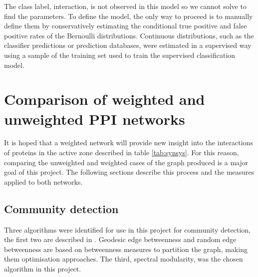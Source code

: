 
The class label, interaction, is not observed in this model so we cannot solve to find the parameters.
To define the model, the only way to proceed is to manually define them by conservatively estimating the conditional true positive and false positive rates of the Bernoulli distributions.
Continuous distributions, such as the classifier predictions or prediction databases, were estimated in a supervised way using a sample of the training set used to train the supervised classification model.


\section{Comparison of weighted and unweighted \ac{PPI} networks}

It is hoped that a weighted network will provide new insight into the interactions of proteins in the active zone described in table \ref{tab:synsys}.
For this reason, comparing the unweighted and weighted cases of the graph produced is a major goal of this project.
The following sections describe this process and the measures applied to both networks.

\subsection{Community detection}
\label{communitydetection}
Three algorithms were identified for use in this project for community detection, the first two are described in \textcite{newman_finding_2004}.
Geodesic edge betweenness and random edge betweenness are based on betweenness measures to partition the graph, making them optimisation approaches.
The third, spectral modularity, was the chosen algorithm in this project.

